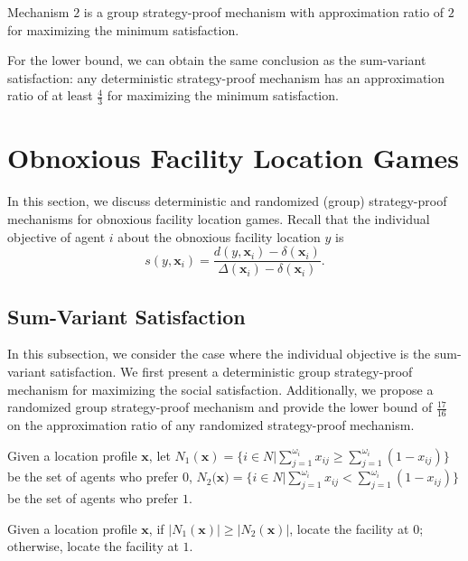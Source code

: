 \documentclass[runningheads]{11llncst}
\begin{document}
\begin{theorem}
    Mechanism $2$ is a group strategy-proof mechanism with approximation ratio of $2$ for maximizing the minimum satisfaction.
\end{theorem}



For the lower bound, we can obtain the same conclusion as the sum-variant satisfaction: any  deterministic strategy-proof mechanism has an approximation ratio of at least $\frac{4}{3}$ for maximizing the minimum satisfaction.



\section{Obnoxious Facility Location Games}
In this section, we discuss  deterministic  and randomized (group) strategy-proof mechanisms for obnoxious facility location games.  Recall that the individual objective of agent $i$ about the obnoxious facility location $y$ is $$s(y,\textbf{x}_i)=\frac{d(y,\textbf{x}_i)-\delta(\textbf{x}_i)}{\Delta(\textbf{x}_i)-\delta(\textbf{x}_i)}.$$




\subsection{Sum-Variant Satisfaction}

In this subsection, we consider the case where the individual objective is the sum-variant satisfaction. We first present a deterministic group strategy-proof mechanism for maximizing the social satisfaction. Additionally, we propose a randomized group strategy-proof mechanism and  provide the lower bound of $\frac{17}{16}$ on the approximation ratio of any randomized strategy-proof mechanism.



Given a location profile $\textbf{x}$, let  $N_1(\textbf{x})=\{i\in N|\sum_{j=1}^{\omega_i}x_{ij} \geq \sum_{j=1}^{\omega_i}(1-x_{ij})\}$ be the set of agents who prefer $0$, $N_2(\textbf{x)}=\{i\in N|\sum_{j=1}^{\omega_i}x_{ij} < \sum_{j=1}^{\omega_i}(1-x_{ij})\}$ be the set of agents who prefer $1$.  

\begin{mechanism}\label{th3}
    Given a location profile $\textbf{x}$, if $|N_1(\textbf{x})|\geq |N_2(\textbf{x})|$, locate the facility at $0$;  otherwise, locate the facility at $1$.
\end{mechanism}
\end{document}
